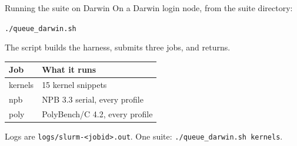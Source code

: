 \documentclass[aspectratio=169,11pt]{beamer}
\begin{document}
\begin{frame}{Running the suite on Darwin}
  On a Darwin login node, from the suite directory:
  \vspace{0.6em}
  \begin{center}
  \texttt{./queue\_darwin.sh}
  \end{center}
  \vspace{0.5em}
  The script builds the harness, submits three jobs, and returns.
  \vspace{0.4em}
  \begin{tabular}{@{}ll@{}}
    \toprule
    Job & What it runs \\
    \midrule
    kernels & 15 kernel snippets \\
    npb & NPB 3.3 serial, every profile \\
    poly & PolyBench/C 4.2, every profile \\
    \bottomrule
  \end{tabular}\par
  \vspace{0.45em}
  Logs are \texttt{logs/slurm-<jobid>.out}.
  One suite: \texttt{./queue\_darwin.sh kernels}.
\end{frame}
\end{document}
